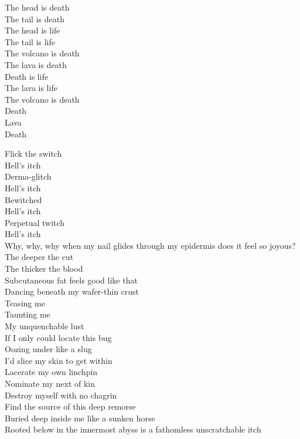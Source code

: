 The head is death\\
The tail is death\\
The head is life\\
The tail is life\\

The volcano is death\\
The lava is death\\
Death is life\\
The lava is life\\

The volcano is death\\
Death\\
Lava\\
Death\\




Flick the switch\\
Hell's itch\\
Derma-glitch\\
Hell's itch\\
Bewitched\\
Hell's itch\\
Perpetual twitch\\
Hell's itch\\

Why, why, why when my nail glides through my epidermis does it feel so joyous?\\
The deeper the cut\\
The thicker the blood\\
Subcutaneous fat feels good like that\\
Dancing beneath my wafer-thin crust\\
Teasing me\\
Taunting me\\
My unquenchable lust\\
If I only could locate this bug\\
Oozing under like a slug\\
I'd slice my skin to get within\\
Lacerate my own linchpin\\
Nominate my next of kin\\
Destroy myself with no chagrin\\
Find the source of this deep remorse\\
Buried deep inside me like a sunken horse\\
Rooted below in the innermost abyss is a fathomless unscratchable itch\\

